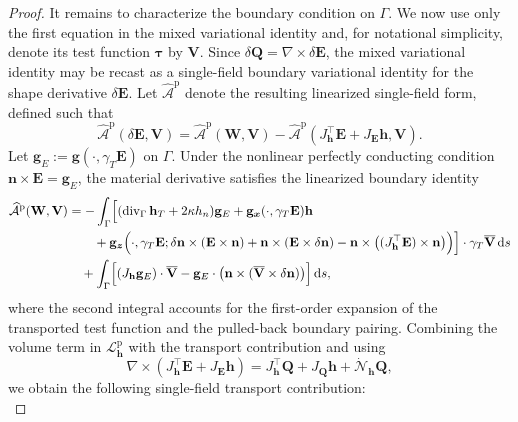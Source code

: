 \documentclass[12pt,reqno]{amsart}
\theoremstyle{definition}
\numberwithin{equation}{section}
\begin{document}
\begin{proof}
It remains to characterize the boundary condition on \(\Gamma\). We now use
only the first equation in the mixed variational identity and, for notational
simplicity, denote its test function \(\boldsymbol{\tau}\) by \(\mathbf V\). Since $\delta\mathbf{Q} = \nabla \times \delta\mathbf{E}$, the mixed variational identity may be recast as a single-field boundary variational identity for the shape derivative $\delta\mathbf{E}$. Let $\widehat{\mathcal{A}}^{\mathrm{p}}$ denote the resulting linearized single-field form, defined such that
\[
\widehat{\mathcal{A}}^{\mathrm{p}}(\delta\mathbf{E}, \mathbf{V}) = \widehat{\mathcal{A}}^{\mathrm{p}}(\mathbf{W}, \mathbf{V}) - \widehat{\mathcal{A}}^{\mathrm{p}}\left(J_{\mathbf{h}}^{\top}\mathbf{E} + J_{\mathbf{E}}\mathbf{h}, \mathbf{V}\right).
\]
Let $\mathbf{g}_E := \mathbf{g}(\cdot, \gamma_T \mathbf{E})$ on $\Gamma$. Under the nonlinear perfectly conducting condition $\mathbf{n} \times \mathbf{E} = \mathbf{g}_E$, the material derivative satisfies the linearized boundary identity
\begin{equation*}
\begin{aligned}
\widehat{\mathcal{A}}^{\mathrm{p}}(\mathbf{W}, \mathbf{V}) &= -\int_\Gamma \Bigl[ (\operatorname{div}_\Gamma \mathbf{h}_T + 2\kappa h_n) \mathbf{g}_E + \mathbf{g}_{\boldsymbol{x}}(\cdot, \gamma_T \mathbf{E}) \mathbf{h} \\
&\qquad + \mathbf{g}_{\boldsymbol{z}} \Bigl( \cdot, \gamma_T \mathbf{E}; \delta \mathbf{n} \times (\mathbf{E} \times \mathbf{n}) + \mathbf{n} \times (\mathbf{E} \times \delta \mathbf{n}) - \mathbf{n} \times \bigl( (J_{\mathbf{h}}^{\top} \mathbf{E}) \times \mathbf{n} \bigr) \Bigr) \Bigr] \cdot \gamma_T\overline{\mathbf{V}} \, \mathrm{d}s \\
&\quad +\int_\Gamma \Bigl[ (J_{\mathbf{h}} \mathbf{g}_E) \cdot \overline{\mathbf{V}} - \mathbf{g}_E \cdot \bigl( \mathbf{n} \times (\overline{\mathbf{V}} \times \delta \mathbf{n}) \bigr) \Bigr] \, \mathrm{d}s,
\end{aligned}
\end{equation*}
where the second integral accounts for the first-order expansion of the transported test function and the pulled-back boundary pairing. 
Combining the volume term in \(\mathcal L_{\mathbf h}^{\mathrm p}\) with the
transport contribution and using
\[
\nabla\times
(J_{\mathbf h}^{\top}\mathbf E+J_{\mathbf E}\mathbf h)
=
J_{\mathbf h}^{\top}\mathbf Q
+
J_{\mathbf Q}\mathbf h
+
\dot{\mathcal N}_{\mathbf h}\mathbf Q,
\]
we obtain the following single-field transport contribution:
\begin{equation*}

\end{equation*}
\end{proof}
\end{document}
